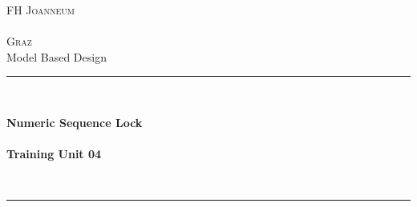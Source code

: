 \thispagestyle{empty}


\begin{titlepage}

	\begin{center}
	
	\textsc{
		\LARGE FH Joanneum\\~\\Graz}\\[1.5cm]
	\vfill{}
	\large Model Based Design
	\\[0.5cm]
	\newcommand{\HRule}{\rule{\linewidth}{0.5mm}}
	\HRule
	\\[0.4cm]
	{
	
		\Huge \bfseries Numeric Sequence Lock\\
						
	        ~\\
	        \large  Training Unit 04  }
	\\[0.4cm]
	\HRule
	\\[0.5cm]
	
	
	\vfill{}
	

\end{center}
\end{titlepage}

